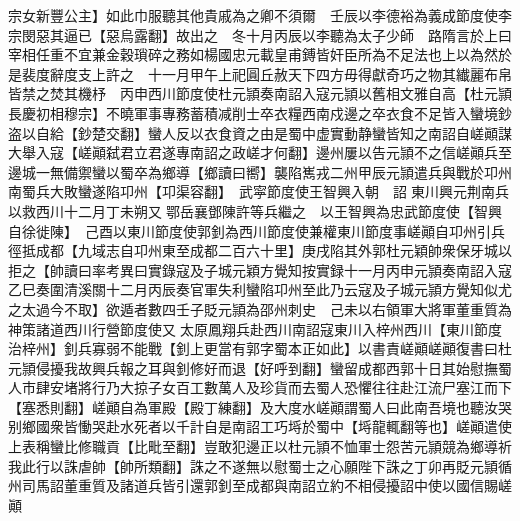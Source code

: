 宗女新豐公主】如此巾服聽其他貴戚為之卿不須爾　壬辰以李德裕為義成節度使李宗閔惡其逼已【惡烏露翻】故出之　冬十月丙辰以李聽為太子少師　路隋言於上曰宰相任重不宜兼金穀瑣碎之務如楊國忠元載皇甫鎛皆奸臣所為不足法也上以為然於是裴度辭度支上許之　十一月甲午上祀圓丘赦天下四方毋得獻奇巧之物其纎麗布帛皆禁之焚其機杼　丙申西川節度使杜元頴奏南詔入寇元頴以舊相文雅自高【杜元頴長慶初相穆宗】不曉軍事專務蓄積减削士卒衣糧西南戍邊之卒衣食不足皆入蠻境鈔盗以自給【鈔楚交翻】蠻人反以衣食資之由是蜀中虚實動静蠻皆知之南詔自嵯顚謀大舉入寇【嵯顚弑君立君遂專南詔之政嵯才何翻】邊州屢以告元頴不之信嵯顚兵至邊城一無備禦蠻以蜀卒為鄉導【鄉讀曰嚮】襲陷嶲戎二州甲辰元頴遣兵與戰於卭州南蜀兵大敗蠻遂陷卭州【卭渠容翻】　武寜節度使王智興入朝　詔東川興元荆南兵以救西川十二月丁未朔又鄂岳襄鄧陳許等兵繼之　以王智興為忠武節度使【智興自徐徙陳】　己酉以東川節度使郭釗為西川節度使兼權東川節度事嵯顚自卭州引兵徑抵成都【九域志自卭州東至成都二百六十里】庚戌陷其外郭杜元穎帥衆保牙城以拒之【帥讀曰率考異曰實錄寇及子城元穎方覺知按實録十一月丙申元頴奏南詔入寇乙巳奏圍清溪關十二月丙辰奏官軍失利蠻陷卭州至此乃云寇及子城元頴方覺知似尤之太過今不取】欲遁者數四壬子貶元頴為邵州刺史　己未以右領軍大將軍董重質為神策諸道西川行營節度使又太原鳳翔兵赴西川南詔寇東川入梓州西川【東川節度治梓州】釗兵寡弱不能戰【釗上更當有郭字蜀本正如此】以書責嵯顚嵯顚復書曰杜元頴侵擾我故興兵報之耳與釗修好而退【好呼到翻】蠻留成都西郭十日其始慰撫蜀人市肆安堵將行乃大掠子女百工數萬人及珍貨而去蜀人恐懼往往赴江流尸塞江而下【塞悉則翻】嵯顚自為軍殿【殿丁練翻】及大度水嵯顚謂蜀人曰此南吾境也聽汝哭别鄉國衆皆慟哭赴水死者以千計自是南詔工巧埓於蜀中【埓龍輒翻等也】嵯顚遣使上表稱蠻比修職貢【比毗至翻】豈敢犯邊正以杜元頴不恤軍士怨苦元頴競為鄉導祈我此行以誅虐帥【帥所類翻】誅之不遂無以慰蜀士之心願陛下誅之丁卯再貶元頴循州司馬詔董重質及諸道兵皆引還郭釗至成都與南詔立約不相侵擾詔中使以國信賜嵯顚

